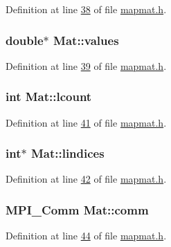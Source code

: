 Definition at line \hyperlink{mapmat_8h_source_l00038}{38} of file \hyperlink{mapmat_8h_source}{mapmat.\-h}.

\hypertarget{structMat_a6239320537db64ae9c1432f31f51e04b}{
\subsubsection[{values}]{\setlength{\rightskip}{0pt plus 5cm}double$\ast$ Mat\-::values}}\label{structMat_a6239320537db64ae9c1432f31f51e04b}


Definition at line \hyperlink{mapmat_8h_source_l00039}{39} of file \hyperlink{mapmat_8h_source}{mapmat.\-h}.

\hypertarget{structMat_a983857e6f4ddb2c19a5119bcf1b6af63}{
\subsubsection[{lcount}]{\setlength{\rightskip}{0pt plus 5cm}int Mat\-::lcount}}\label{structMat_a983857e6f4ddb2c19a5119bcf1b6af63}


Definition at line \hyperlink{mapmat_8h_source_l00041}{41} of file \hyperlink{mapmat_8h_source}{mapmat.\-h}.

\hypertarget{structMat_a26f484e28815cb59e3cd5600f8832de4}{
\subsubsection[{lindices}]{\setlength{\rightskip}{0pt plus 5cm}int$\ast$ Mat\-::lindices}}\label{structMat_a26f484e28815cb59e3cd5600f8832de4}


Definition at line \hyperlink{mapmat_8h_source_l00042}{42} of file \hyperlink{mapmat_8h_source}{mapmat.\-h}.

\hypertarget{structMat_a9a3894b7f67951ccae6fa1446fd00200}{
\subsubsection[{comm}]{\setlength{\rightskip}{0pt plus 5cm}M\-P\-I\-\_\-\-Comm Mat\-::comm}}\label{structMat_a9a3894b7f67951ccae6fa1446fd00200}


Definition at line \hyperlink{mapmat_8h_source_l00044}{44} of file \hyperlink{mapmat_8h_source}{mapmat.\-h}.

